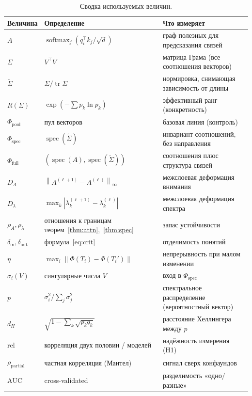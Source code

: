 \documentclass[11pt,a4paper]{article}
\theoremstyle{definition}
\theoremstyle{plain}
\newcommand{\norm}[1]{\left\lVert #1 \right\rVert}
\newcommand{\abs}[1]{\left\lvert #1 \right\rvert}
\DeclareMathOperator{\tr}{tr}
\DeclareMathOperator{\spec}{spec}
\DeclareMathOperator{\softmax}{softmax}
\begin{document}
\begin{table}[h]
\centering
\begin{tabular}{@{}lll@{}}
\toprule
Величина & Определение & Что измеряет\\
\midrule
$A$ & $\softmax_j(q_i^\top k_j/\sqrt d)$ & граф полезных для предсказания связей\\
$\Sigma$ & $V^\top V$ & матрица Грама (все соотношения векторов)\\
$\tilde\Sigma$ & $\Sigma/\tr\Sigma$ & нормировка, снимающая зависимость от длины\\
$R(\Sigma)$ & $\exp(-\sum p_k\ln p_k)$ & эффективный ранг (конкретность)\\
$\Phi_{\mathrm{pool}}$ & пул векторов & базовая линия (контроль)\\
$\Phi_{\mathrm{spec}}$ & $\spec(\tilde\Sigma)$ & инвариант соотношений, без направления\\
$\Phi_{\mathrm{full}}$ & $(\spec(A),\spec(\tilde\Sigma))$ & соотношения плюс структура связей\\
$D_A$ & $\norm{A^{(\ell+1)}-A^{(\ell)}}_\infty$ & межслоевая деформация внимания\\
$D_\lambda$ & $\max_k\abs{\lambda_k^{(\ell+1)}-\lambda_k^{(\ell)}}$ & межслоевая деформация спектра\\
$\rho_A,\rho_\lambda$ & отношения к границам теорем~\ref{thm:attn},~\ref{thm:spec} & запас устойчивости\\
$\delta_{\mathrm{in}},\delta_{\mathrm{out}}$ & формула~\eqref{eq:crit} & отделимость понятий\\
$\eta$ & $\max_i\norm{\Phi(T_i)-\Phi(T_i')}$ & непрерывность при малом изменении\\
$\sigma_i(V)$ & сингулярные числа $V$ & вход в $\Phi_{\mathrm{spec}}$\\
$p$ & $\sigma_i^2/\sum_j\sigma_j^2$ & спектральное распределение (вероятностный вектор)\\
$d_H$ & $\sqrt{1-\sum_k\sqrt{p_kq_k}}$ & расстояние Хеллингера между $p$\\
$\mathrm{rel}$ & корреляция двух половин / моделей & надёжность измерения (H1)\\
$\rho_\text{partial}$ & частная корреляция (Мантел) & сигнал сверх конфаундов\\
$\mathrm{AUC}$ & cross-validated & разделимость «одно/разные»\\
\bottomrule
\end{tabular}
\caption{Сводка используемых величин.}
\end{table}
\end{document}

